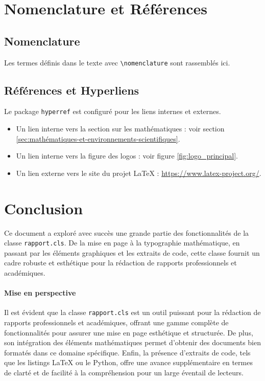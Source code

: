 \documentclass{butexFR}
\begin{document}
\section{Nomenclature et Références}

\subsection{Nomenclature}
Les termes définis dans le texte avec \verb|\nomenclature| sont rassemblés ici.
\printnomenclature

\subsection{Références et Hyperliens}
Le package \texttt{hyperref} est configuré pour les liens internes et externes.
\begin{itemize}
\item Un lien interne vers la section sur les mathématiques : voir section \ref{sec:mathématiques-et-environnements-scientifiques}.
\item Un lien interne vers la figure des logos : voir figure \ref{fig:logo_principal}.
\item Un lien externe vers le site du projet LaTeX : \url{https://www.latex-project.org/}.
\end{itemize}


\section{Conclusion}

Ce document a exploré avec succès une grande partie des fonctionnalités de la classe \texttt{rapport.cls}. De la mise en page à la typographie mathématique, en passant par les éléments graphiques et les extraits de code, cette classe fournit un cadre robuste et esthétique pour la rédaction de rapports professionnels et académiques.

\paragraph*{Mise en perspective}
Il est évident que la classe \texttt{rapport.cls} est un outil puissant pour la rédaction de rapports professionnels et académiques, offrant une gamme complète de fonctionnalités pour assurer une mise en page esthétique et structurée. De plus, son intégration des éléments mathématiques permet d'obtenir des documents bien formatés dans ce domaine spécifique. Enfin, la présence d'extraits de code, tels que les listings LaTeX ou le Python, offre une avance supplémentaire en termes de clarté et de facilité à la compréhension pour un large éventail de lecteurs.

\merci
\end{document}
